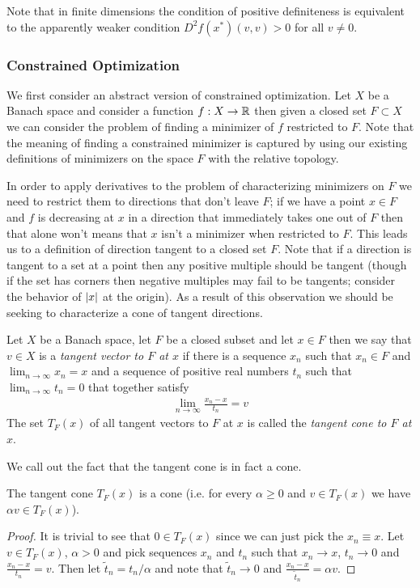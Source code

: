 Note that in finite dimensions the condition of positive definiteness
is equivalent to the apparently weaker condition $D^2f(x^*) (v,v) > 0$
for all $v \neq 0$.

\subsubsection{Constrained Optimization}

We first consider an abstract version of constrained
optimization.  Let $X$ be a Banach space and consider a function $f :
X \to \mathbb{R}$ then given a closed set $F \subset X$ we can consider
the problem of finding a minimizer of $f$ restricted to $F$.  Note
that the meaning of finding a constrained minimizer is captured by
using our existing definitions of minimizers on the space $F$ with the
relative topology.

In order
to apply derivatives to the problem of characterizing minimizers on
$F$ we need to restrict them to directions that don't leave $F$;
if we have a point $x \in F$ and $f$ is decreasing at $x$ in a direction that immediately takes one out of
$F$ then that alone won't means that $x$ isn't a minimizer when
restricted to $F$.  This leads us to a definition of direction tangent
to a closed set $F$.  Note that if a direction is tangent to a set at
a point then any positive multiple should be tangent (though if the
set has corners then negative multiples may fail to be tangents;
consider the behavior of $\left \vert x \right \vert$ at the origin).  As a result of
this observation we should be seeking to characterize a cone of
tangent directions.  
\begin{defn}Let $X$ be a Banach space, let $F$ be a closed subset and
  let $x \in F$ then we say that $v \in X$ is a \emph{tangent vector to $F$
  at $x$} if there is a sequence $x_n$ such that $x_n \in F$ and
  $\lim_{n \to \infty} x_n = x$ and a sequence of positive real numbers
  $t_n$ such that $\lim_{n \to \infty} t_n = 0$ that together satisfy
\begin{align*}
\lim_{n \to \infty} \frac{x_n - x}{t_n} = v
\end{align*}
The set $T_F(x)$ of all tangent vectors to $F$ at $x$ is called the
\emph{tangent cone to $F$ at $x$}.
\end{defn}

We call out the fact that the tangent cone is in fact a cone.
\begin{prop}The tangent cone $T_F(x)$ is a cone (i.e. for every
  $\alpha \geq 0$ and $v \in T_F(x)$ we have $\alpha v \in T_F(x)$).
\end{prop}
\begin{proof}
It is trivial to see that $0 \in T_F(x)$ since we can just pick the
$x_n \equiv x$.  Let $v \in T_F(x)$, $\alpha > 0$ and pick sequences $x_n$ and $t_n$ such that $x_n \to x$, $t_n \to 0$ and
$\frac{x_n - x}{t_n} = v$.  Then let $\tilde{t}_n = t_n/\alpha$ and note that
$\tilde{t}_n \to 0$ and $\frac{x_n -x}{\tilde{t}_n} = \alpha v$.
\end{proof}

